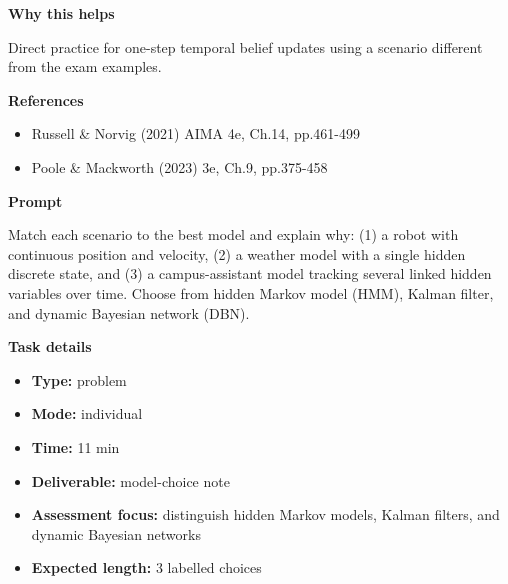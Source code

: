 \documentclass[11pt]{article}
\begin{document}
\begin{tcolorbox}[colback=white,colframe=MidnightBlue,title={Q2 Structured Problem},fonttitle=\bfseries,breakable]
{\large\bfseries\color{MidnightBlue} Why this helps}\par\medskip
Direct practice for one-step temporal belief updates using a scenario different from the exam examples.

{\large\bfseries\color{MidnightBlue} References}\par\medskip
\begin{itemize}\item Russell \& Norvig (2021) AIMA 4e, Ch.14, pp.461-499
\item Poole \& Mackworth (2023) 3e, Ch.9, pp.375-458\end{itemize}
\end{tcolorbox}

\begin{tcolorbox}[colback=white,colframe=MidnightBlue,title={Q3 Structured Problem},fonttitle=\bfseries,breakable]
\begin{center}
\end{center}

{\large\bfseries\color{MidnightBlue} Prompt}\par\medskip
Match each scenario to the best model and explain why: (1) a robot with continuous position and velocity, (2) a weather model with a single hidden discrete state, and (3) a campus-assistant model tracking several linked hidden variables over time. Choose from hidden Markov model (HMM), Kalman filter, and dynamic Bayesian network (DBN).

{\large\bfseries\color{MidnightBlue} Task details}\par\medskip
\begin{itemize}\item \textbf{Type:} problem
\item \textbf{Mode:} individual
\item \textbf{Time:} 11 min
\item \textbf{Deliverable:} model-choice note
\item \textbf{Assessment focus:} distinguish hidden Markov models, Kalman filters, and dynamic Bayesian networks
\item \textbf{Expected length:} 3 labelled choices\end{itemize}


\end{tcolorbox}
\end{document}
